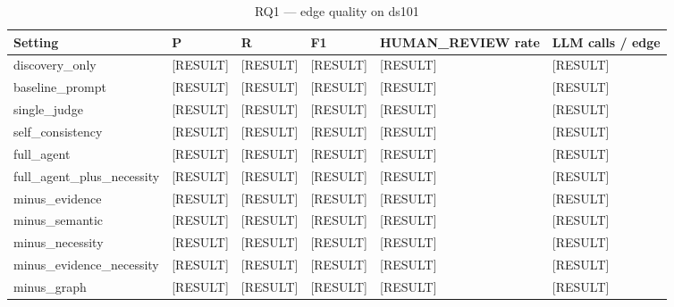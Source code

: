 
\begin{table}[t]
\centering
\caption{RQ1 --- edge quality on ds101}
\label{tab:rq1_ds101}
\small
\begin{tabular}{llllll}
\toprule
Setting & P & R & F1 & HUMAN\_REVIEW rate & LLM calls / edge \\
\midrule
discovery\_only & [RESULT] & [RESULT] & [RESULT] & [RESULT] & [RESULT] \\
baseline\_prompt & [RESULT] & [RESULT] & [RESULT] & [RESULT] & [RESULT] \\
single\_judge & [RESULT] & [RESULT] & [RESULT] & [RESULT] & [RESULT] \\
self\_consistency & [RESULT] & [RESULT] & [RESULT] & [RESULT] & [RESULT] \\
full\_agent & [RESULT] & [RESULT] & [RESULT] & [RESULT] & [RESULT] \\
full\_agent\_plus\_necessity & [RESULT] & [RESULT] & [RESULT] & [RESULT] & [RESULT] \\
minus\_evidence & [RESULT] & [RESULT] & [RESULT] & [RESULT] & [RESULT] \\
minus\_semantic & [RESULT] & [RESULT] & [RESULT] & [RESULT] & [RESULT] \\
minus\_necessity & [RESULT] & [RESULT] & [RESULT] & [RESULT] & [RESULT] \\
minus\_evidence\_necessity & [RESULT] & [RESULT] & [RESULT] & [RESULT] & [RESULT] \\
minus\_graph & [RESULT] & [RESULT] & [RESULT] & [RESULT] & [RESULT] \\
\bottomrule
\end{tabular}
\end{table}

